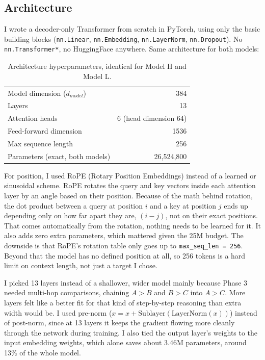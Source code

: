 \documentclass[10pt]{article}
\begin{document}
\subsection{Architecture}

I wrote a decoder-only Transformer from scratch in PyTorch, using only the basic building blocks (\texttt{nn.Linear}, \texttt{nn.Embedding}, \texttt{nn.LayerNorm}, \texttt{nn.Dropout}). No \texttt{nn.Transformer*}, no HuggingFace anywhere. Same architecture for both models:

\begin{table}[h]
\centering
\small
\begin{tabular}{lr}
\toprule
Model dimension ($d_{model}$) & 384 \\
Layers & 13 \\
Attention heads & 6 (head dimension 64) \\
Feed-forward dimension & 1536 \\
Max sequence length & 256 \\
Parameters (exact, both models) & 26,524,800 \\
\bottomrule
\end{tabular}
\caption{Architecture hyperparameters, identical for Model H and Model L.}
\end{table}

For position, I used RoPE (Rotary Position Embeddings) instead of a learned or sinusoidal scheme. RoPE rotates the query and key vectors inside each attention layer by an angle based on their position. Because of the math behind rotation, the dot product between a query at position $i$ and a key at position $j$ ends up depending only on how far apart they are, $(i-j)$, not on their exact positions. That comes automatically from the rotation, nothing needs to be learned for it. It also adds zero extra parameters, which mattered given the 25M budget. The downside is that RoPE's rotation table only goes up to \texttt{max\_seq\_len = 256}. Beyond that the model has no defined position at all, so 256 tokens is a hard limit on context length, not just a target I chose.

I picked 13 layers instead of a shallower, wider model mainly because Phase 3 needed multi-hop comparisons, chaining $A > B$ and $B > C$ into $A > C$. More layers felt like a better fit for that kind of step-by-step reasoning than extra width would be. I used pre-norm ($x = x + \text{Sublayer}(\text{LayerNorm}(x))$) instead of post-norm, since at 13 layers it keeps the gradient flowing more cleanly through the network during training. I also tied the output layer's weights to the input embedding weights, which alone saves about 3.46M parameters, around 13\% of the whole model.
\end{document}
